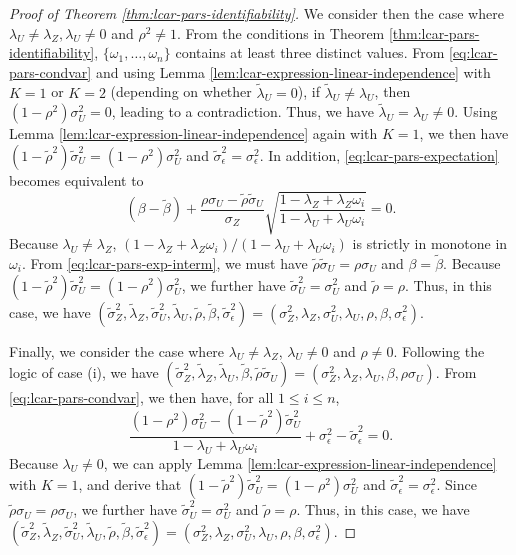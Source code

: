\documentclass[11pt]{article}
\theoremstyle{definition}
\theoremstyle{remark}
\begin{document}
\begin{proof}[Proof of Theorem \ref{thm:lcar-pars-identifiability}]
We consider then the case where 
$\lambda_U\neq \lambda_Z, \lambda_U \neq 0$ and $\rho^2\neq 1$. 
From the conditions in Theorem \ref{thm:lcar-pars-identifiability}, 
$\{\omega_1, \ldots, \omega_n\}$ contains at least three distinct values. From \eqref{eq:lcar-pars-condvar} and using Lemma \ref{lem:lcar-expression-linear-independence} with $K=1$ or $K=2$ (depending on whether $\tilde\lambda_U=0$), if $\tilde\lambda_U \neq \lambda_U$, then $(1-\rho^2)\sigma_U^2 =0$, leading to a contradiction. Thus, we have $\tilde\lambda_U = \lambda_U \neq 0$. Using Lemma \ref{lem:lcar-expression-linear-independence} again with $K=1$, we then have $(1-\tilde\rho^2)\tilde\sigma_U^2 = (1-\rho^2)\sigma_U^2$ and $\tilde\sigma_\epsilon^2 = \sigma_\epsilon^2$. In addition, \eqref{eq:lcar-pars-expectation} becomes equivalent to 
\begin{equation}\label{eq:lcar-pars-exp-interm}
(\beta-\tilde\beta) + \frac{\rho \sigma_U - \tilde\rho \tilde\sigma_U}{\sigma_Z}\sqrt{\frac{1-\lambda_Z + \lambda_Z \omega_i}{1-\lambda_U+\lambda_U\omega_i}} =0.
\end{equation}
Because $\lambda_U\neq \lambda_Z$, $(1-\lambda_Z+\lambda_Z\omega_i) /(1-\lambda_U+\lambda_U \omega_i)$ is strictly in monotone in $\omega_i$. From \eqref{eq:lcar-pars-exp-interm}, we must have $\tilde\rho\tilde\sigma_U = \rho\sigma_U$ and $\beta = \tilde\beta$. Because $(1-\tilde\rho^2)\tilde\sigma_U^2 = (1-\rho^2)\sigma_U^2$, we further have $\tilde\sigma_U^2 = \sigma_U^2$ and $\tilde\rho = \rho$. 
Thus, in this case, 
we have 
$(\tilde\sigma_Z^2, \tilde\lambda_Z, \tilde\sigma_U^2, \tilde\lambda_U, \tilde\rho, \tilde\beta, \tilde\sigma_\epsilon^2) = (\sigma_Z^2, \lambda_Z, \sigma_U^2, \lambda_U, \rho, \beta, \sigma_\epsilon^2)$. 

Finally, we consider the case where $\lambda_U\neq \lambda_Z$, $\lambda_U\neq 0$ and $\rho\neq 0$. 
Following the logic of case (i), 
we have $(\tilde\sigma_Z^2, \tilde\lambda_Z, \tilde\lambda_U, \tilde\beta, \tilde\rho \tilde\sigma_U) = (\sigma_Z^2, \lambda_Z, \lambda_U, \beta, \rho \sigma_U)$. 
From \eqref{eq:lcar-pars-condvar}, we then have, for all $1\le i\le n$,  
\[ \frac{(1-\rho^2)\sigma_U^2 - (1-\tilde\rho^2)\tilde\sigma_U^2}{1-\lambda_U + \lambda_U \omega_i} +\sigma_\epsilon^2 - \tilde\sigma_\epsilon^2  =0.\]
Because $\lambda_U\neq 0$, we can apply Lemma \ref{lem:lcar-expression-linear-independence} with $K=1$, and derive that $(1-\tilde\rho^2)\tilde\sigma_U^2 = (1-\rho^2)\sigma_U^2$ and $\tilde\sigma_\epsilon^2 = \sigma_\epsilon^2$. Since $\tilde\rho\sigma_U = \rho\sigma_U$, we further have 
$\tilde\sigma_U^2 = \sigma_U^2$ and $\tilde\rho =\rho$.
Thus, in this case, we have 
$(\tilde\sigma_Z^2, \tilde\lambda_Z, \tilde\sigma_U^2, \tilde\lambda_U, \tilde\rho, \tilde\beta, \tilde\sigma_\epsilon^2) = (\sigma_Z^2, \lambda_Z, \sigma_U^2, \lambda_U, \rho, \beta, \sigma_\epsilon^2)$. 




\end{proof}
\end{document}
